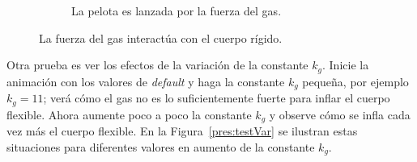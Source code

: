 \begin{figure}
\begin{subfigure}[b]{0.45\textwidth}
    \caption{La pelota es lanzada por la fuerza del gas.}
    \label{pres:test4}
  \end{subfigure}
 \caption[Experimento: Fuerza del gas - cuerpo rígido]{La fuerza del gas interactúa con el cuerpo rígido.} 
 \label{pres:test}
\end{figure}

Otra prueba es ver los efectos de la variación de la constante $k_g$.
Inicie la animación con los valores de \emph{\textenglish{default}} y haga la constante $k_g$ pequeña, por ejemplo $k_g =11$; verá cómo el gas no es lo suficientemente fuerte para inflar el cuerpo flexible.
Ahora aumente poco a poco la constante $k_g$ y observe cómo se infla cada vez más el cuerpo flexible.
En la Figura~\ref{pres:testVar} se ilustran estas situaciones para diferentes valores en aumento de la constante $k_g$.

